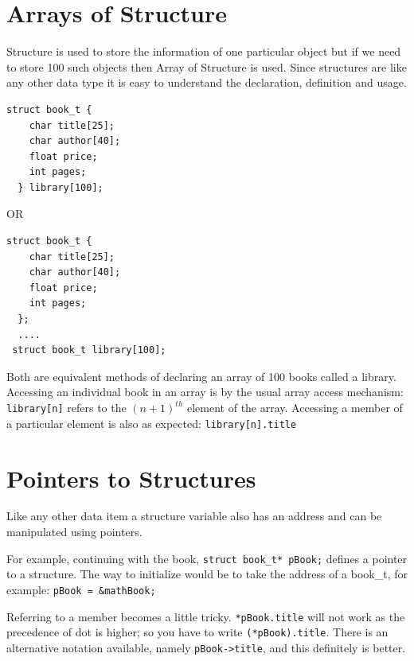 \documentclass[11pt,a4paper]{article}
\begin{document}
\section*{Arrays of Structure}
Structure is used to store the information of one particular object but if we need to store 100 such objects then Array of Structure is used. Since structures are like any other data type it is easy to understand the declaration, definition and usage.

\begin{lstlisting}[numbers=none]
  struct book_t {
    char title[25];
    char author[40];
    float price;
    int pages;
  } library[100];
\end{lstlisting}

OR 

\begin{lstlisting}[numbers=none]
  struct book_t {
    char title[25];
    char author[40];
    float price;
    int pages;
  };
  ....
 struct book_t library[100];
\end{lstlisting}

Both are equivalent methods of declaring an array of 100 books called a library. Accessing an individual book in an array is by the usual array access mechanism: \texttt{library[n]} refers to the $(n + 1)^{th}$ element of the array. Accessing a member of a particular element is also as expected: \texttt{library[n].title} 

\section*{Pointers to Structures}
Like any other data item a structure variable also has an address and can be manipulated using pointers.

For example, continuing with the book, \lstinline!struct book_t* pBook;! defines a pointer to a structure. The way to initialize would be to take the address of a book\_t, for example: \texttt{pBook = \&mathBook;}

Referring to a member becomes a little tricky. \texttt{*pBook.title} will not work as the precedence of dot is higher; so you have to write \texttt{(*pBook).title}. There is an  alternative notation available, namely
\texttt{pBook->title}, and this definitely is better.
\end{document}
